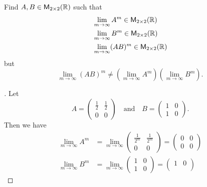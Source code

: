 \begin{ex}\label{ex:5.3.5}
  Find \(A, B \in \mathsf{M}_{{2} \times 2}({\mathbb{R}})\) such that
  \begin{align*}
     & \lim_{m \to \infty} A^m \in \mathsf{M}_{{2} \times 2}({\mathbb{R}})    \\
     & \lim_{m \to \infty} B^m \in \mathsf{M}_{{2} \times 2}({\mathbb{R}})    \\
     & \lim_{m \to \infty} (AB)^m \in \mathsf{M}_{{2} \times 2}({\mathbb{R}})
  \end{align*}
  but
  \[
    \lim_{m \to \infty} (AB)^m \neq (\lim_{m \to \infty} A^m) (\lim_{m \to \infty} B^m).
  \]
\end{ex}

\begin{proof}[]
  Let
  \[
    A = \begin{pmatrix}
      \frac{1}{2} & \frac{1}{2} \\
      0           & 0
    \end{pmatrix} \quad \text{and} \quad B = \begin{pmatrix}
      1 & 0 \\
      1 & 0
    \end{pmatrix}.
  \]
  Then we have
  \begin{align*}
    \lim_{m \to \infty} A^m    & = \lim_{m \to \infty} \begin{pmatrix}
                                                         \frac{1}{2^m} & \frac{1}{2^m} \\
                                                         0             & 0
                                                       \end{pmatrix} = \begin{pmatrix}
                                                                         0 & 0 \\
                                                                         0 & 0
                                                                       \end{pmatrix} \\
    \lim_{m \to \infty} B^m    & = \lim_{m \to \infty} \begin{pmatrix}
                                                         1 & 0 \\
                                                         1 & 0
                                                       \end{pmatrix} = \begin{pmatrix}
                                                                         1 & 0 \\

\end{pmatrix}
\end{align*}
\end{proof}
